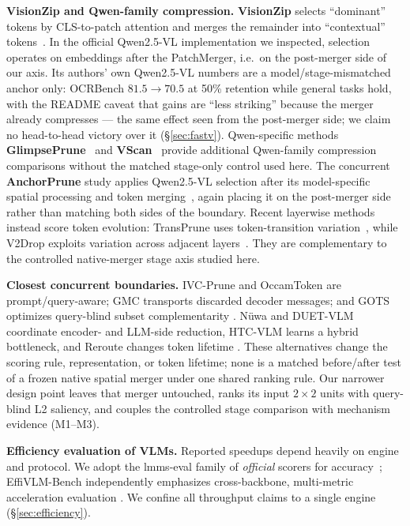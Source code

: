 \documentclass[sigconf,nonacm]{acmart}
\begin{document}
\textbf{VisionZip and Qwen-family compression.} \textbf{VisionZip} selects
``dominant'' tokens by CLS-to-patch attention and merges the remainder into
``contextual'' tokens~\cite{yang2024visionzip}. In the official Qwen2.5-VL
implementation we inspected, selection operates on embeddings after the
PatchMerger, i.e.\ on the post-merger side of our axis. Its authors' own
Qwen2.5-VL numbers are a model/stage-mismatched anchor
only: OCRBench $81.5 \to 70.5$ at 50\% retention while general tasks hold, with
the README caveat that gains are ``less striking'' because the merger already
compresses --- the same effect seen from the post-merger side; we claim no
head-to-head victory over it (\S\ref{sec:fastv}). Qwen-specific methods
\textbf{GlimpsePrune}~\cite{zeng2025glimpseprune} and
\textbf{VScan}~\cite{zhang2025vscan} provide additional Qwen-family compression
comparisons without the matched stage-only control used here. The concurrent
\textbf{AnchorPrune} study applies Qwen2.5-VL selection after its model-specific
spatial processing and token merging~\cite{oh2026anchorprune}, again placing it
on the post-merger side rather than matching both sides of the boundary.
Recent layerwise methods instead score token evolution: TransPrune uses
token-transition variation~\cite{li2026transprune}, while V2Drop exploits
variation across adjacent layers~\cite{chen2026v2drop}. They are complementary
to the controlled native-merger stage axis studied here.

\textbf{Closest concurrent boundaries.} IVC-Prune and OccamToken are
prompt/query-aware; GMC transports discarded decoder messages; and GOTS
optimizes query-blind subset complementarity
\cite{sun2026ivcprune,li2026occamtoken,qian2026gmc,ling2026gots}. N\"uwa and
DUET-VLM coordinate encoder- and LLM-side reduction, HTC-VLM learns a hybrid
bottleneck, and Reroute changes token lifetime
\cite{huang2026nuwa,singh2026duetvlm,zhang2025htcvlm,yang2026reroute}.
These alternatives change the scoring rule, representation, or token lifetime;
none is a matched before/after test of a frozen native spatial merger under one
shared ranking rule. Our narrower design point leaves that merger untouched,
ranks its input $2\!\times\!2$ units with query-blind L2 saliency, and couples
the controlled stage comparison with mechanism evidence (M1--M3).

\textbf{Efficiency evaluation of VLMs.} Reported speedups depend heavily on
engine and protocol. We adopt the lmms-eval family of \emph{official} scorers
for accuracy~\cite{zhang2024lmmseval}; EffiVLM-Bench independently emphasizes
cross-backbone, multi-metric acceleration evaluation
\cite{wang2025effivlmbench}. We confine all throughput claims to a
single engine (\S\ref{sec:efficiency}).
\end{document}
